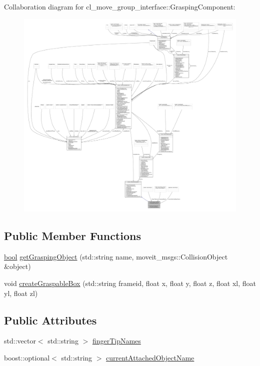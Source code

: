 Collaboration diagram for cl\+\_\+move\+\_\+group\+\_\+interface\+:\+:Grasping\+Component\+:
\nopagebreak
\begin{figure}[H]
\begin{center}
\leavevmode
\includegraphics[width=350pt]{classcl__move__group__interface_1_1GraspingComponent__coll__graph}
\end{center}
\end{figure}
\subsection*{Public Member Functions}
\begin{DoxyCompactItemize}
\item 
\hyperlink{classbool}{bool} \hyperlink{classcl__move__group__interface_1_1GraspingComponent_a283b379a7b7ad91c69ee94a057730165}{get\+Grasping\+Object} (std\+::string name, moveit\+\_\+msgs\+::\+Collision\+Object \&object)
\item 
void \hyperlink{classcl__move__group__interface_1_1GraspingComponent_aac73eb5b4dc499998ad727cec8ffd48c}{create\+Graspable\+Box} (std\+::string frameid, float x, float y, float z, float xl, float yl, float zl)
\end{DoxyCompactItemize}
\subsection*{Public Attributes}
\begin{DoxyCompactItemize}
\item 
std\+::vector$<$ std\+::string $>$ \hyperlink{classcl__move__group__interface_1_1GraspingComponent_afc08a0abc3220a377d0bbf798383a42a}{finger\+Tip\+Names}
\item 
boost\+::optional$<$ std\+::string $>$ \hyperlink{classcl__move__group__interface_1_1GraspingComponent_a486b5c831dc81ae0bf909b585ba7c615}{current\+Attached\+Object\+Name}
\end{DoxyCompactItemize}
